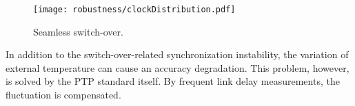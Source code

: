 \begin{figure}[t]
\centering
\texttt{[image: robustness/clockDistribution.pdf]}
\caption{Seamless switch-over.}
\label{fig:switch-over}
\end{figure}

In addition to the switch-over-related synchronization instability, the variation of external temperature 
can cause an accuracy degradation. This problem, however, is solved by the PTP standard itself. By 
frequent link delay measurements, the fluctuation is compensated. 

